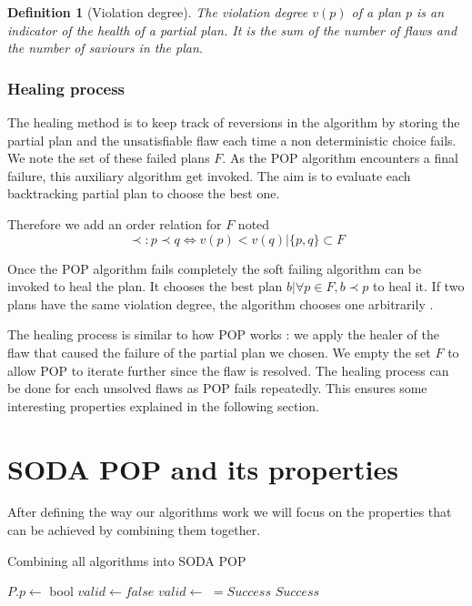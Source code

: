 \documentclass[]{article}
\newtheorem{definition}{Definition}
\begin{document}
\begin{definition}[Violation degree]

The violation degree \(v(p)\) of a plan \(p\) is an indicator of the
health of a partial plan. It is the sum of the number of flaws and the
number of saviours in the plan.

\end{definition}

\subsubsection{Healing process}\label{healing-process}

The healing method is to keep track of reversions in the algorithm by
storing the partial plan and the unsatisfiable flaw each time a non
deterministic choice fails. We note the set of these failed plans \(F\).
As the POP algorithm encounters a final failure, this auxiliary
algorithm get invoked. The aim is to evaluate each backtracking partial
plan to choose the best one.

Therefore we add an order relation for \(F\) noted
\[\prec : p \prec q \iff v(p) < v(q) | \{p, q\} \subset F\]

Once the POP algorithm fails completely the soft failing algorithm can
be invoked to heal the plan. It chooses the best plan
\(b | \forall p \in F, b \prec p\) to heal it. If two plans have the
same violation degree, the algorithm chooses one arbitrarily .

The healing process is similar to how POP works : we apply the healer of
the flaw that caused the failure of the partial plan we chosen. We empty
the set \(F\) to allow POP to iterate further since the flaw is
resolved. The healing process can be done for each unsolved flaws as POP
fails repeatedly. This ensures some interesting properties explained in
the following section.

\section{SODA POP and its properties}\label{soda-pop-and-its-properties}

After defining the way our algorithms work we will focus on the
properties that can be achieved by combining them together.

\begin{algorithm}\caption{Combining all algorithms into SODA POP}\label{soda}\begin{algorithmic}

 \State \(P.p \gets\)
 \State {} \State bool
\(valid \gets false\)  \(valid \gets\)
\State {} \(= Success\) 
\State {} \State \Return \(Success\) \EndIf
        \State {} \EndWhile
\EndFunction

\end{algorithmic}\end{algorithm}
\end{document}
